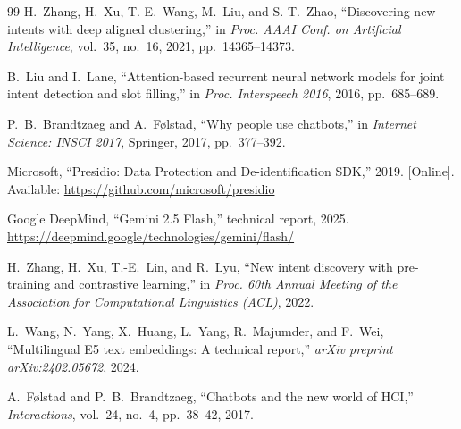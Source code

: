 \documentclass[conference]{IEEEtran}
\begin{document}
\begin{thebibliography}{99}
H.~Zhang, H.~Xu, T.-E.~Wang, M.~Liu, and S.-T.~Zhao,
``Discovering new intents with deep aligned clustering,''
in \emph{Proc. AAAI Conf. on Artificial Intelligence},
vol.~35, no.~16, 2021, pp.~14365--14373.

B.~Liu and I.~Lane,
``Attention-based recurrent neural network models for joint intent
detection and slot filling,''
in \emph{Proc. Interspeech 2016}, 2016, pp.~685--689.

P.~B.~Brandtzaeg and A.~F{\o}lstad,
``Why people use chatbots,''
in \emph{Internet Science: INSCI 2017}, Springer, 2017, pp.~377--392.

Microsoft,
``Presidio: Data Protection and De-identification SDK,'' 2019.
[Online]. Available: \url{https://github.com/microsoft/presidio}

Google DeepMind, ``Gemini 2.5 Flash,'' technical report, 2025.
\url{https://deepmind.google/technologies/gemini/flash/}

H.~Zhang, H.~Xu, T.-E.~Lin, and R.~Lyu,
``New intent discovery with pre-training and contrastive learning,''
in \emph{Proc. 60th Annual Meeting of the Association for Computational Linguistics (ACL)}, 2022.

L.~Wang, N.~Yang, X.~Huang, L.~Yang, R.~Majumder, and F.~Wei,
``Multilingual E5 text embeddings: A technical report,''
\emph{arXiv preprint arXiv:2402.05672}, 2024.

A.~F{\o}lstad and P.~B.~Brandtzaeg,
``Chatbots and the new world of HCI,''
\emph{Interactions}, vol.~24, no.~4, pp.~38--42, 2017.

\end{thebibliography}
\end{document}
